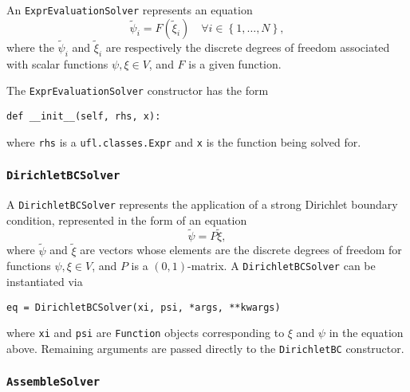 \documentclass[11pt]{article}
\begin{document}
An \texttt{ExprEvaluationSolver} represents an equation
\begin{equation*}
  \tilde{\psi}_i = F \left( \tilde{\xi}_i \right)
    \quad \forall i \in \left\{ 1, \ldots, N \right\},
\end{equation*}
where the $\tilde{\psi}_i$ and $\tilde{\xi}_i$ are respectively the discrete
degrees of freedom associated with scalar functions $\psi, \xi \in V$, and $F$
is a given function.

The \texttt{ExprEvaluationSolver} constructor has the form
\begin{lstlisting}
def __init__(self, rhs, x):
\end{lstlisting}
where \texttt{rhs} is a \texttt{ufl.classes.Expr} and \texttt{x} is the
function being solved for.

\subsubsection{\texttt{DirichletBCSolver}}

A \texttt{DirichletBCSolver} represents the application of a strong Dirichlet
boundary condition, represented in the form of an equation
\begin{equation*}
  \tilde{\psi} = P \tilde{\xi},
\end{equation*}
where $\tilde{\psi}$ and $\tilde{\xi}$ are vectors whose elements are the
discrete degrees of freedom for functions $\psi, \xi \in V$, and $P$ is a
$\left( 0, 1 \right)$-matrix. A \texttt{DirichletBCSolver} can be instantiated
via
\begin{lstlisting}
eq = DirichletBCSolver(xi, psi, *args, **kwargs)
\end{lstlisting}
where \texttt{xi} and \texttt{psi} are \texttt{Function} objects corresponding
to $\xi$ and $\psi$ in the equation above. Remaining arguments are passed
directly to the \texttt{DirichletBC} constructor.

\subsubsection{\texttt{AssembleSolver}}\label{sect:AssembleSolver}
\end{document}
